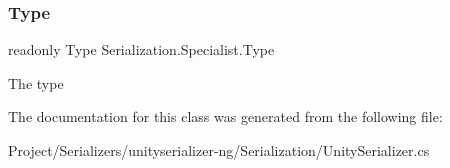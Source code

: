 \subsubsection{\texorpdfstring{Type}{Type}}
{\footnotesize\ttfamily readonly Type Serialization.\+Specialist.\+Type}



The type 



The documentation for this class was generated from the following file\+:\begin{DoxyCompactItemize}
\item 
Project/\+Serializers/unityserializer-\/ng/\+Serialization/Unity\+Serializer.\+cs\end{DoxyCompactItemize}
